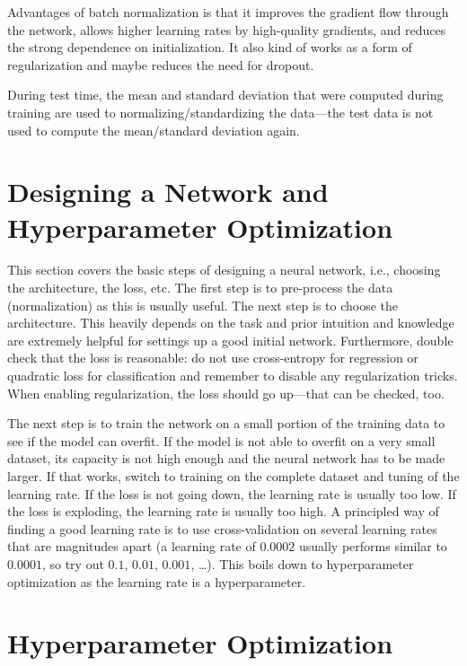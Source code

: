 			Advantages of batch normalization is that it improves the gradient flow through the network, allows higher learning rates by high-quality gradients, and reduces the strong dependence on initialization. It also kind of works as a form of regularization and maybe reduces the need for dropout.

			During test time, the mean and standard deviation that were computed during training are used to normalizing/standardizing the data---the test data is not used to compute the mean/standard deviation again.

	\section{Designing a Network and Hyperparameter Optimization}
		This section covers the basic steps of designing a neural network, i.e., choosing the architecture, the loss, etc. The first step is to pre-process the data (normalization) as this is usually useful. The next step is to choose the architecture. This heavily depends on the task and prior intuition and knowledge are extremely helpful for settings up a good initial network. Furthermore, double check that the loss is reasonable: do not use cross-entropy for regression or quadratic loss for classification and remember to disable any regularization tricks. When enabling regularization, the loss should go up---that can be checked, too.

		The next step is to train the network on a small portion of the training data to see if the model can overfit. If the model is not able to overfit on a very small dataset, its capacity is not high enough and the neural network has to be made larger. If that works, switch to training on the complete dataset and tuning of the learning rate. If the loss is not going down, the learning rate is usually too low. If the loss is exploding, the learning rate is usually too high. A principled way of finding a good learning rate is to use cross-validation on several learning rates that are magnitudes apart (a learning rate of \(0.0002\) usually performs similar to \(0.0001\), so try out \(0.1\), \(0.01\), \(0.001\), \dots). This boils down to hyperparameter optimization as the learning rate is a hyperparameter.

	\section{Hyperparameter Optimization}
		\label{subsec:hyperparameterOpt}

